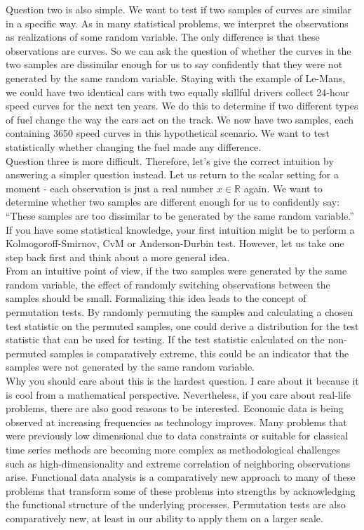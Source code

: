 \documentclass[12pt, a4paper]{article}
\theoremstyle{MAstyle} \newtheorem{assumption}{Assumption}[section]
\theoremstyle{MAstyle} \newtheorem{definition}{Definition}[section]
\theoremstyle{MAstyle} \newtheorem{theorem}{Theorem}[section]
\begin{document}
			Question two is also simple. We want to test if two samples of curves are similar in a specific way. As in many statistical problems, we interpret the observations as realizations of some random variable. The only difference is that these observations are curves. So we can ask the question of whether the curves in the two samples are dissimilar enough for us to say confidently that they were not generated by the same random variable. 
			Staying with the example of Le-Mans, we could have two identical cars with two equally skillful drivers collect 24-hour speed curves for the next ten years. We do this to determine if two different types of fuel change the way the cars act on the track. We now have two samples, each containing 3650 speed curves in this hypothetical scenario. 
			We want to test statistically whether changing the fuel made any difference.\\
			
			Question three is more difficult. Therefore, let's give the correct intuition by answering a simpler question instead. Let us return to the scalar setting for a moment - each observation is just a real number $x \in \mathbb{R}$ again. We want to determine whether two samples are different enough for us to confidently say: ``These samples are too dissimilar to be generated by the same random variable.'' If you have some statistical knowledge, your first intuition might be to perform a Kolmogoroff-Smirnov, CvM or Anderson-Durbin test. However, let us take one step back first and think about a more general idea.\\
			
			From an intuitive point of view, if the two samples were generated by the same random variable, the effect of randomly switching observations between the samples should be small. Formalizing this idea leads to the concept of permutation tests. By randomly permuting the samples and calculating a chosen test statistic on the permuted samples, one could derive a distribution for the test statistic that can be used for testing. If the test statistic calculated on the non-permuted samples is comparatively extreme, this could be an indicator that the samples were not generated by the same random variable.\\
			
			Why you should care about this is the hardest question. I care about it because it is cool from a mathematical perspective. Nevertheless, if you care about real-life problems, there are also good reasons to be interested. Economic data is being observed at increasing frequencies as technology improves. Many problems that were previously low dimensional due to data constraints or suitable for classical time series methods are becoming more complex as methodological challenges such as high-dimensionality and extreme correlation of neighboring observations arise. Functional data analysis is a comparatively new approach to many of these problems that transform some of these problems into strengths by acknowledging the functional structure of the underlying processes. Permutation tests are also comparatively new, at least in our ability to apply them on a larger scale.
			
\end{document}
